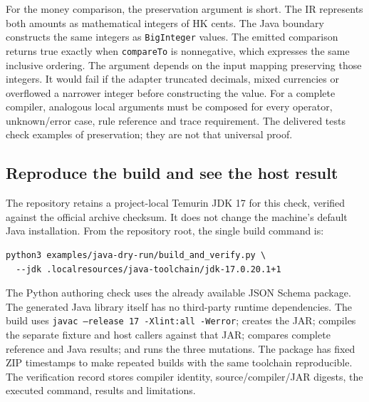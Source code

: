 For the money comparison, the preservation argument is short. The IR represents
both amounts as mathematical integers of HK cents. The Java boundary constructs
the same integers as \texttt{BigInteger} values. The emitted comparison returns
true exactly when \texttt{compareTo} is nonnegative, which expresses the same
inclusive ordering. The argument depends on the input mapping preserving those
integers. It would fail if the adapter truncated decimals, mixed currencies or
overflowed a narrower integer before constructing the value. For a complete
compiler, analogous local arguments must be composed for every operator,
unknown/error case, rule reference and trace requirement. The delivered tests
check examples of preservation; they are not that universal proof.

\subsection{Reproduce the build and see the host result}
\label{merge:P-03d-java-delivery:04}


The repository retains a project-local Temurin JDK 17 for this check, verified
against the official archive checksum. It does not change the machine's default
Java installation. From the repository root, the single build command is:

\begin{minipage}{\textwidth}
\begin{lstlisting}
python3 examples/java-dry-run/build_and_verify.py \
  --jdk .localresources/java-toolchain/jdk-17.0.20.1+1
\end{lstlisting}
\end{minipage}

The Python authoring check uses the already available JSON Schema package. The
generated Java library itself has no third-party runtime dependencies. The build
uses \texttt{javac --release 17 -Xlint:all -Werror}; creates the JAR; compiles
the separate fixture and host callers against that JAR; compares complete
reference and Java results; and runs the three mutations. The package has fixed
ZIP timestamps to make repeated builds with the same toolchain reproducible.
The verification record stores compiler identity, source/compiler/JAR digests,
the executed command, results and limitations.

